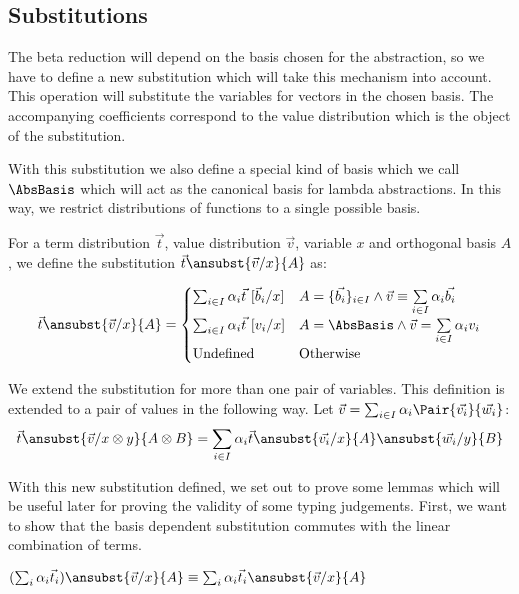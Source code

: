 \subsection{Substitutions}

The beta reduction will depend on the basis chosen for the abstraction, so we have to define a new substitution which will take this mechanism into account. This operation will substitute the variables for vectors in the chosen basis. The accompanying coefficients correspond to the value distribution which is the object of the substitution.
  
With this substitution we also define a special kind of basis which we call $\AbsBasis$ which will act as the canonical basis for lambda abstractions. In this way, we restrict distributions of functions to a single possible basis.

\begin{definition}
  For a term distribution $\vec{t}$, value distribution $\vec{v}$, variable $x$ and orthogonal basis $A$, we define the substitution $\vec{t}\ansubst{\vec{v}/x}{A}$ as:
  
  \[
  \vec{t}\ansubst{\vec{v}/x}{A} = 
    \begin{cases}
      \sum_{i\in I} \alpha_i \vec t\ [\vec b_i / x] 
      & A=\{\vec{b_i}\}_{i\in I}\wedge\vec{v}\equiv\sum\limits_{i\in I} \alpha_i \vec{b_i} \\
      \sum_{i\in I}\alpha_i\vec{t}\ [v_i/x] & A = \AbsBasis\wedge\vec{v}=\sum\limits_{i\in I}\alpha_i v_i\\
      \text{Undefined} & \text{Otherwise}
    \end{cases}
  \]

  We extend the substitution for more than one pair of variables. This definition is extended to a pair of values in the following way. Let $\vec v = \sum_{i\in I} \alpha_i \Pair{\vec{v_i}}{\vec{w_i}}$:
  \[
    \vec t\ansubst{\vec{v}/x\otimes y}{A \otimes B} = \sum_{i\in I} \alpha_i \vec t\ansubst{\vec{v_i}/x}{A}\ansubst{\vec{w_i}/y}{B}
  \]
\end{definition}

With this new substitution defined, we set out to prove some lemmas which will be useful later for proving the validity of some typing judgements. First, we want to show that the basis dependent substitution commutes with the linear combination of terms.

\begin{lemma}\label{lem:distributiveSubstitution}
  $(\sum_i \alpha_i\vec t_i)\ansubst{\vec v/x}{A} \equiv \sum_i \alpha_i\vec t_i \ansubst{\vec v/x}{A}$ 
\end{lemma}

